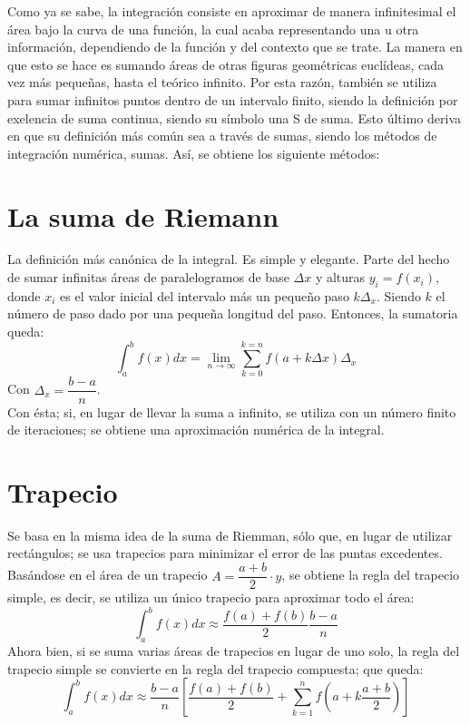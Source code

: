 \documentclass[12pt,oneside,FLEQN]{report}
\begin{document}
{Como ya se sabe, la integración consiste en aproximar de manera infinitesimal el área bajo la curva de una función, la cual acaba representando una u otra información, dependiendo de la función y del contexto que se trate. La manera en que esto se hace es sumando áreas de otras figuras geométricas euclídeas, cada vez más pequeñas, hasta el teórico infinito. Por esta razón, también se utiliza para sumar infinitos puntos dentro de un intervalo finito, siendo la definición por exelencia de suma continua, siendo su símbolo una S de suma. Esto último deriva en que su definición más común sea a través de sumas, siendo los métodos de integración numérica, sumas. Así, se obtiene los siguiente métodos:
	\section{La suma de Riemann}
		La definición más canónica de la integral. Es simple y elegante. Parte del hecho de sumar infinitas áreas de paralelogramos de base $\Delta x$ y alturas $y_{i}=f(x_{i})$, donde $x_{i}$ es el valor inicial del intervalo más un pequeño paso $k\Delta_{x}$. Siendo $k$ el número de paso dado por una pequeña longitud del paso. Entonces, la sumatoria queda:
		\begin{equation}
			\int_{a}^{b}f(x)dx=\lim_{n\to\infty}\sum_{k=0}^{k=n}f(a+k\Delta x)\Delta_{x}
		\end{equation}
		Con $\Delta_{x}=\dfrac{b-a}{n}$.\\

		Con ésta; si, en lugar de llevar la suma a infinito, se utiliza con un número finito de iteraciones; se obtiene una aproximación numérica de la integral.
	\section{Trapecio}
		Se basa en la misma idea de la suma de Riemman, sólo que, en lugar de utilizar rectángulos; se usa trapecios para minimizar el error de las puntas excedentes. Basándose en el área de un trapecio $A=\dfrac{a+b}{2}\cdot y$, se obtiene la regla del trapecio simple, es decir, se utiliza un único trapecio para aproximar todo el área:
		\begin{equation}
			\int_{a}^{b}f(x)dx\approx \dfrac{f(a)+f(b)}{2}\dfrac{b-a}{n}
		\end{equation}
		Ahora bien, si se suma varias áreas de trapecios en lugar de uno solo, la regla del trapecio simple se convierte en la regla del trapecio compuesta; que queda:
		\begin{equation}
			\int_{a}^{b}f(x)dx\approx\dfrac{b-a}{n}\left[\dfrac{f(a)+f(b)}{2}+\sum_{k=1}^{n}f\left(a+k\dfrac{a+b}{2}\right)\right]
		\end{equation}
}
\end{document}
